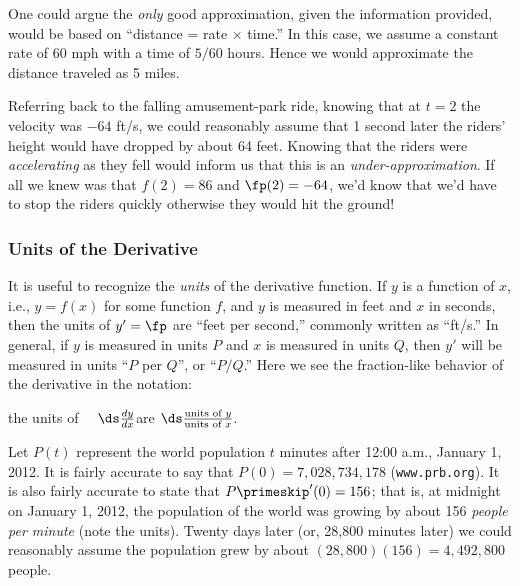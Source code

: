 One could argue the \textit{only} good approximation, given the information provided, would be based on ``distance = rate $\times$ time.'' In this case, we assume a constant rate of 60 mph with a time of $5/60$ hours. Hence we would approximate the distance traveled as 5 miles.\bigskip


Referring back to the falling amusement-park ride, knowing that at $t=2$ the velocity was $-64$ ft/s, we could reasonably assume that 1 second later the riders' height would have dropped by about 64 feet. Knowing that the riders were \textit{accelerating} as they fell would inform us that this is an \textit{under-approximation}. If all we knew was that $f(2) = 86$ and $\fp(2) = -64$, we'd know that we'd have to stop the riders quickly otherwise they would hit the ground!

\subsubsection{Units of the Derivative}

It is useful to recognize the \textit{units} of the derivative function. If $y$ is a function of $x$, i.e., $y=f(x)$ for some function $f$, and $y$ is measured in feet and $x$ in seconds, then the units of $y' = \fp$ are ``feet per second,'' commonly written as ``ft/s.'' In general, if $y$ is measured in units $P$ and $x$ is measured in units $Q$, then $y'$ will be measured in units ``$P$ per $Q$'', or ``$P/Q$.'' Here we see the fraction-like behavior of the derivative in the notation:
	\begin{center}
	the units of $\quad\ds \frac{dy}{dx}$\quad are \quad$\ds \frac{\text{units of $y$}}{\text{units of $x$}}$.
	\end{center}

{Let $P(t)$ represent the world population $t$ minutes after 12:00 a.m., January 1, 2012. It is fairly accurate to say that $P(0) = 7,028,734,178$ (\texttt{www.prb.org}). It is also fairly accurate to state that $P\primeskip'(0) = 156$; that is, at midnight on January 1, 2012, the population of the world was growing by about 156 \textit{people per minute} (note the units). Twenty days later (or, 28,800 minutes later) we could reasonably assume the population grew by about $(28,800)(156) = 4,492,800$ people.}

